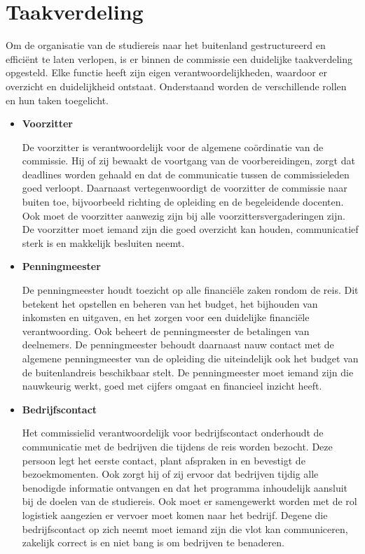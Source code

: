 \section{Taakverdeling}

Om de organisatie van de studiereis naar het buitenland gestructureerd en efficiënt te laten verlopen, is er binnen de commissie een duidelijke taakverdeling opgesteld. Elke functie heeft zijn eigen verantwoordelijkheden, waardoor er overzicht en duidelijkheid ontstaat. Onderstaand worden de verschillende rollen en hun taken toegelicht.

\begin{itemize}
	\item \textbf{Voorzitter}
	
	De voorzitter is verantwoordelijk voor de algemene coördinatie van de commissie. Hij of zij bewaakt de voortgang van de voorbereidingen, zorgt dat deadlines worden gehaald en dat de communicatie tussen de commissieleden goed verloopt. Daarnaast vertegenwoordigt de voorzitter de commissie naar buiten toe, bijvoorbeeld richting de opleiding en de begeleidende docenten. Ook moet de voorzitter aanwezig zijn bij alle voorzittersvergaderingen zijn. De voorzitter moet iemand zijn die goed overzicht kan houden, communicatief sterk is en makkelijk besluiten neemt.
	
	\vspace{1cm}
	
	\item \textbf{Penningmeester}
	
	De penningmeester houdt toezicht op alle financiële zaken rondom de reis. Dit betekent het opstellen en beheren van het budget, het bijhouden van inkomsten en uitgaven, en het zorgen voor een duidelijke financiële verantwoording. Ook beheert de penningmeester de betalingen van deelnemers. De penningmeester behoudt daarnaast nauw contact met de algemene penningmeester van de opleiding die uiteindelijk ook het budget van de buitenlandreis beschikbaar stelt. De penningmeester moet iemand zijn die nauwkeurig werkt, goed met cijfers omgaat en financieel inzicht heeft.
	
	\vspace{1cm}
	
	\item \textbf{Bedrijfscontact}
	
	Het commissielid verantwoordelijk voor bedrijfscontact onderhoudt de communicatie met de bedrijven die tijdens de reis worden bezocht. Deze persoon legt het eerste contact, plant afspraken in en bevestigt de bezoekmomenten. Ook zorgt hij of zij ervoor dat bedrijven tijdig alle benodigde informatie ontvangen en dat het programma inhoudelijk aansluit bij de doelen van de studiereis. Ook moet er samengewerkt worden met de rol logistiek aangezien er vervoer moet komen naar het bedrijf. Degene die bedrijfscontact op zich neemt moet iemand zijn die vlot kan communiceren, zakelijk correct is en niet bang is om bedrijven te benaderen.
	

\end{itemize}
